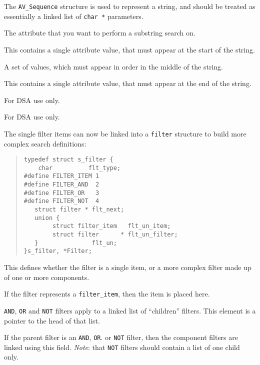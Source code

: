 The \verb"AV_Sequence" structure is used to represent a string, and should be
treated as essentially a linked list of \verb"char *" parameters.
\begin{describe}
\begin{describe}
\item [\verb"fi\_sub\_type":] The attribute that you want to perform a
substring search on.
\item [\verb"fi\_sub\_initial":] This contains a single attribute value,
that must appear at the start of the string.
\item [\verb"fi\_sub\_any":] A set of values, which must appear in order in
the middle of the string.
\item [\verb"fi\_sun\_final":] This contains a single attribute value,
that must appear at the end of the string.
\item [\verb"fi\_sub\_match":] For DSA use only.
\end{describe}
\item [\verb"fi\_ifp":] For DSA use only.
\end{describe}

The single filter items can now be linked into a \verb"filter" structure
to build more complex search definitions:
\begin{quote}\small\begin{verbatim}
typedef struct s_filter {
    char          flt_type;
#define FILTER_ITEM 1
#define FILTER_AND  2
#define FILTER_OR   3
#define FILTER_NOT  4
   struct filter * flt_next;
   union {
        struct filter_item   flt_un_item;
        struct filter      * flt_un_filter;
   }               flt_un;
}s_filter, *Filter;
\end{verbatim}\end{quote}

\begin{describe}
\item [\verb"flt\_type":] This defines whether the filter is a single item,
or a more complex filter made up of one or more components.
\item [\verb"flt\_un.flt\_un\_item":] If the filter represents a
\verb"filter_item", then the item is placed here.
\item [\verb"flt\_un.flt\_un\_filter":] \verb"AND", \verb"OR" and \verb"NOT"
filters apply to a linked list of ``children'' filters.  This element is a
pointer to the head of that list.
\item [\verb"flt\_next":] If the parent filter is an \verb"AND", \verb"OR".
or \verb"NOT"
filter, then the component filters are linked using this field. 
{\em Note}: that \verb"NOT" filters should contain a list of one child only.
\end{describe}

